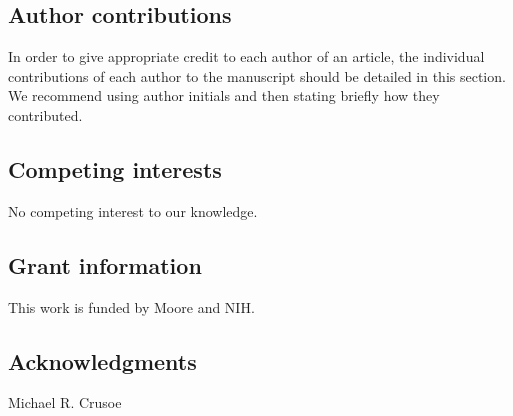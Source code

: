\documentclass[10pt,a4paper,twocolumn]{article}
\begin{document}


\subsection*{Author contributions}
In order to give appropriate credit to each author of an article, the
individual contributions of each author to the manuscript should be
detailed in this section. We recommend using author initials and then
stating briefly how they contributed.

\subsection*{Competing interests}
No competing interest to our knowledge.

\subsection*{Grant information}
This work is funded by Moore and NIH.

\subsection*{Acknowledgments}
Michael R. Crusoe

{\small }

\bigskip








\end{document}

